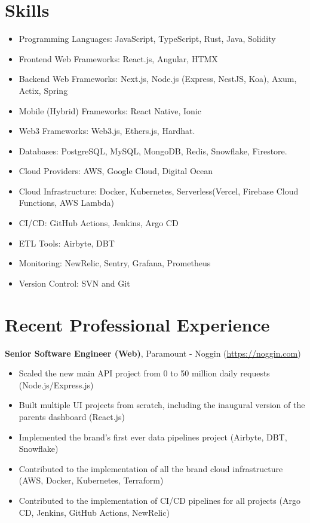 \documentclass[11pt, a4paper]{article}
\begin{document}
\section*{Skills}
\begin{itemize}[noitemsep]
    \item Programming Languages: JavaScript, TypeScript, Rust, Java, Solidity
    \item Frontend Web Frameworks: React.js, Angular, HTMX
    \item Backend Web Frameworks: Next.js, Node.js (Express, NestJS, Koa), Axum, Actix, Spring
    \item Mobile (Hybrid) Frameworks: React Native, Ionic
    \item Web3 Frameworks: Web3.js, Ethers.js, Hardhat.
    \item Databases: PostgreSQL, MySQL, MongoDB, Redis, Snowflake, Firestore.
    \item Cloud Providers: AWS, Google Cloud, Digital Ocean
    \item Cloud Infrastructure: Docker, Kubernetes, Serverless(Vercel, Firebase Cloud Functions, AWS Lambda)
    \item CI/CD: GitHub Actions, Jenkins, Argo CD
    \item ETL Tools: Airbyte, DBT
    \item Monitoring: NewRelic, Sentry, Grafana, Prometheus
    \item Version Control: SVN and Git
\end{itemize}

\section*{Recent Professional Experience}
\textbf{Senior Software Engineer (Web)}, Paramount - Noggin (\href{https://www.noggin.com}{https://noggin.com})
\begin{itemize}[noitemsep]
    \item Scaled the new main API project from 0 to 50 million daily requests (Node.js/Express.js)
    \item Built multiple UI projects from scratch, including the inaugural version of the parents dashboard (React.js)
    \item Implemented the brand's first ever data pipelines project (Airbyte, DBT, Snowflake)
    \item Contributed to the implementation of all the brand cloud infrastructure (AWS, Docker, Kubernetes, Terraform)
    \item Contributed to the implementation of CI/CD pipelines for all projects (Argo CD, Jenkins, GitHub Actions, NewRelic)
\end{itemize}
\end{document}
